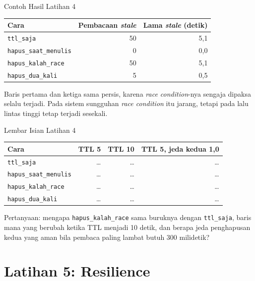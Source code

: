 \documentclass[aspectratio=169, table, 12pt]{beamer}
\begin{document}
\begin{frame}{{\Large Contoh Hasil Latihan 4}}
  \vspace{6pt}
  \centering
  {\small
  \begin{tabularx}{\textwidth}{Xrr}
    \hline
    \textbf{Cara} & \textbf{Pembacaan \textit{stale}} & \textbf{Lama \textit{stale} (detik)} \\
    \hline
    \texttt{ttl\_saja} & 50 & 5,1 \\
    \hline
    \texttt{hapus\_saat\_menulis} & 0 & 0,0 \\
    \hline
    \texttt{hapus\_kalah\_race} & 50 & 5,1 \\
    \hline
    \texttt{hapus\_dua\_kali} & 5 & 0,5 \\
    \hline
  \end{tabularx}}

  \vspace{8pt}
  {\footnotesize Baris pertama dan ketiga sama persis, karena \textit{race
  condition}-nya sengaja dipaksa selalu terjadi. Pada sistem sungguhan
  \textit{race condition} itu jarang, tetapi pada lalu lintas tinggi tetap
  terjadi sesekali.}
\end{frame}

\begin{frame}{{\Large Lembar Isian Latihan 4}}
  \vspace{6pt}
  \centering
  {\small
  \begin{tabularx}{\textwidth}{Xrrr}
    \hline
    \textbf{Cara} & \textbf{TTL 5} & \textbf{TTL 10} & \textbf{TTL 5, jeda kedua 1,0} \\
    \hline
    \texttt{ttl\_saja} & \dots & \dots & \dots \\
    \hline
    \texttt{hapus\_saat\_menulis} & \dots & \dots & \dots \\
    \hline
    \texttt{hapus\_kalah\_race} & \dots & \dots & \dots \\
    \hline
    \texttt{hapus\_dua\_kali} & \dots & \dots & \dots \\
    \hline
  \end{tabularx}}

  \vspace{8pt}
  {\footnotesize Pertanyaan: mengapa \texttt{hapus\_kalah\_race} sama
  buruknya dengan \texttt{ttl\_saja}, baris mana yang berubah ketika TTL
  menjadi 10 detik, dan berapa jeda penghapusan kedua yang aman bila pembaca
  paling lambat butuh 300 milidetik?}
\end{frame}

\section{Latihan 5: Resilience}
\end{document}
